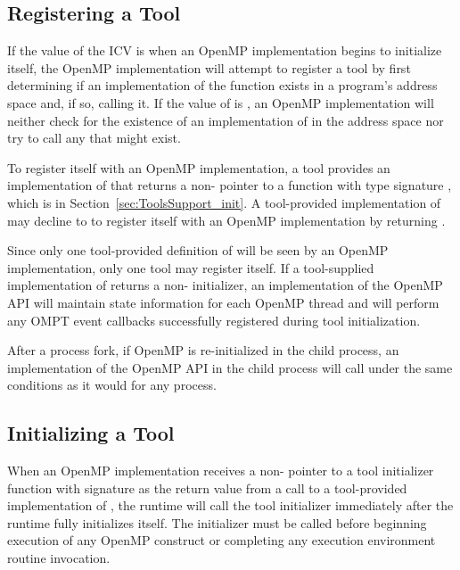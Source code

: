 \subsection{Registering a Tool}
\label{sec:ToolsSupport_Registration}

If the value of the  ICV is 
when an OpenMP implementation begins to initialize itself, 
the OpenMP implementation will attempt to register a tool by first 
determining if
an implementation of the function  exists in a program's address space and, if so, calling it.
If the value of  is , an OpenMP 
implementation will neither check for the existence of an implementation of
 in the address space nor try to call any that might exist.

To register itself with an OpenMP implementation, a tool provides
an implementation of  that returns
a non- pointer to a function with type
signature , which is in
Section~\ref{sec:ToolsSupport_init}.
A tool-provided implementation of  may decline to 
to register itself with an OpenMP implementation by returning
.

Since only one tool-provided definition of  will be seen by an OpenMP implementation, only one tool may register itself.
If a tool-supplied implementation of  returns a non- initializer,
an implementation of the OpenMP API will maintain state information for each OpenMP thread and will perform
any OMPT event callbacks successfully registered during tool initialization.

After a process fork, if OpenMP is re-initialized in the child process,
an implementation of the OpenMP API in the child process will call 
under the same conditions as it would for any process.

\subsection{Initializing a Tool}
\label{sec:tool-initialize}

When an OpenMP implementation receives a non- pointer to a tool initializer function with signature  as the return value from a call to a tool-provided implementation of , the runtime will call the tool initializer immediately after the runtime fully initializes itself.
The initializer must be called before beginning execution of any OpenMP construct or completing any execution environment routine invocation.

